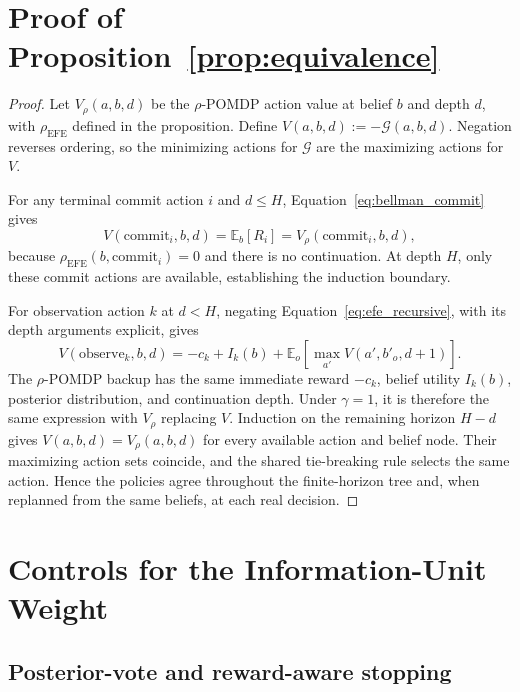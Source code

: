 \documentclass[manuscript, screen, review]{jair}
\begin{document}
\printbibliography


\appendix

\FloatBarrier
\section{Proof of Proposition~\ref{prop:equivalence}}
\label{app:proof}

\begin{proof}
Let $V_\rho(a,b,d)$ be the $\rho$-POMDP action value at belief $b$ and depth $d$, with $\rho_{\mathrm{EFE}}$ defined in the proposition. Define $V(a,b,d):=-\mathcal G(a,b,d)$. Negation reverses ordering, so the minimizing actions for $\mathcal G$ are the maximizing actions for $V$.

For any terminal commit action $i$ and $d\le H$, Equation~\ref{eq:bellman_commit} gives
\[
V(\mathrm{commit}_i,b,d)=\mathbb E_b[R_i]
=V_\rho(\mathrm{commit}_i,b,d),
\]
because $\rho_{\mathrm{EFE}}(b,\mathrm{commit}_i)=0$ and there is no continuation. At depth $H$, only these commit actions are available, establishing the induction boundary.

For observation action $k$ at $d<H$, negating Equation~\ref{eq:efe_recursive}, with its depth arguments explicit, gives
\[
V(\mathrm{observe}_k,b,d)=-c_k+I_k(b)
+\mathbb E_o\!\left[\max_{a'}V(a',b'_o,d+1)\right].
\]
The $\rho$-POMDP backup has the same immediate reward $-c_k$, belief utility $I_k(b)$, posterior distribution, and continuation depth. Under $\gamma=1$, it is therefore the same expression with $V_\rho$ replacing $V$. Induction on the remaining horizon $H-d$ gives $V(a,b,d)=V_\rho(a,b,d)$ for every available action and belief node. Their maximizing action sets coincide, and the shared tie-breaking rule selects the same action. Hence the policies agree throughout the finite-horizon tree and, when replanned from the same beliefs, at each real decision.
\end{proof}

\FloatBarrier
\section{Controls for the Information-Unit Weight}
\label{app:full_tables}

\subsection{Posterior-vote and reward-aware stopping}
\end{document}
